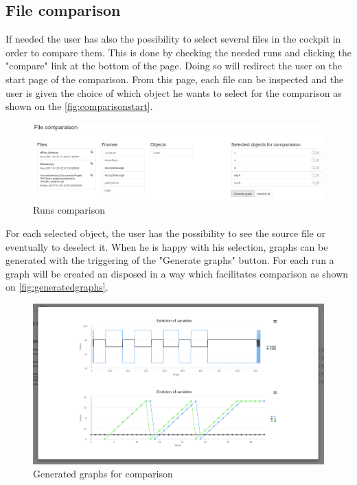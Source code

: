 \subsection{File comparison}
If needed the user has also the possibility to select several files in the cockpit in order to compare them. This is done by checking the needed runs and clicking the "compare" link at the bottom of the page. Doing so will redirect the user on the start page of the comparison. From this page, each file can be inspected and the user is given the choice of which object he wants to select for the comparison as shown on the \autoref{fig:comparisonstart}.
\begin{figure}[h!]
  \centering
    \includegraphics[width=\textwidth]{figures/yoda-comparison.png}
    \caption{Runs comparison}
    \label{fig:comparisonstart}
\end{figure}

For each selected object, the user has the possibility to see the source file or eventually to deselect it. When he is happy with his selection, graphs can be generated with the triggering of the "Generate graphs" button. For each run a graph will be created an disposed in a way which facilitates comparison as shown on \autoref{fig:generatedgraphs}.
\begin{figure}[h!]
  \centering
    \includegraphics[width=\textwidth]{figures/yoda-graphs.png}
    \caption{Generated graphs for comparison}
    \label{fig:generatedgraphs}
\end{figure}

